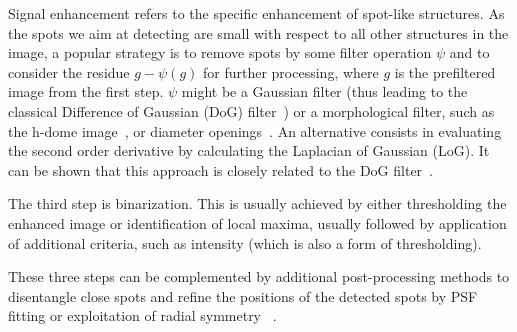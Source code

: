 Signal enhancement refers to the specific enhancement of spot-like structures. As the spots we aim at detecting are small with respect to all other structures in the image, a popular strategy is to remove spots by some filter operation $\psi$ and to consider the residue $g - \psi(g)$ for further processing, where $g$ is the prefiltered image from the first step. $\psi$ might be a Gaussian filter (thus leading to the classical Difference of Gaussian (DoG) filter~\cite{Lindeberg2015}) or a morphological filter, such as the h-dome image~\cite{smal_quantitative_2010}, or diameter openings~\cite{Walter2007}. 
An alternative consists in evaluating the second order derivative by calculating the Laplacian of Gaussian (LoG). It can be shown that this approach is closely related to the DoG filter~\cite{Lindeberg2015}.


The third step is binarization. This is usually achieved by either thresholding the enhanced image or identification of local maxima, usually followed by application of additional criteria, such as intensity (which is also a form of thresholding).  

These three steps can be complemented by additional post-processing methods to disentangle close spots and refine the positions of the detected spots by \ac{PSF} fitting or exploitation of radial symmetry ~\cite{bahry_rs-fish_2021}.

